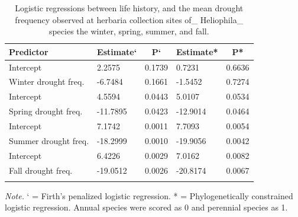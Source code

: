 \documentclass[man,floatsintext]{apa6}
\theoremstyle{definition}
\theoremstyle{definition}
\theoremstyle{definition}
\theoremstyle{remark}
\begin{document}
\begin{table}[tbp]
\begin{center}
\begin{threeparttable}
\caption{\label{tab:modelstable}Logistic regressions between life history, and the mean drought frequency observed at herbaria collection sites of\_ Heliophila\_ species the winter, spring, summer, and fall.}
\begin{tabular}{lllll}
\toprule
Predictor & \multicolumn{1}{c}{Estimate`} & \multicolumn{1}{c}{P`} & \multicolumn{1}{c}{Estimate*} & \multicolumn{1}{c}{P*}\\
\midrule
Intercept & 2.2575 & 0.1739 & 0.7231 & 0.6636\\
Winter drought freq. & -6.7484 & 0.1661 & -1.5452 & 0.7274\\ \midrule
Intercept & 4.5594 & 0.0443 & 5.0107 & 0.0534\\
Spring drought freq. & -11.7895 & 0.0423 & -12.9014 & 0.0464\\ \midrule
Intercept & 7.1742 & 0.0011 & 7.7093 & 0.0054\\
Summer drought freq. & -18.2999 & 0.0010 & -19.9056 & 0.0042\\ \midrule
Intercept & 6.4226 & 0.0029 & 7.0162 & 0.0082\\
Fall drought freq. & -19.0512 & 0.0026 & -20.8174 & 0.0067\\ \midrule
\bottomrule
\addlinespace
\end{tabular}
\begin{tablenotes}[para]
\normalsize{\textit{Note.} ` = Firth's penalized logistic regression. * = Phylogenetically constrained logistic regression. Annual species were scored as 0 and perennial species as 1.}
\end{tablenotes}
\end{threeparttable}
\end{center}
\end{table}
\end{document}
